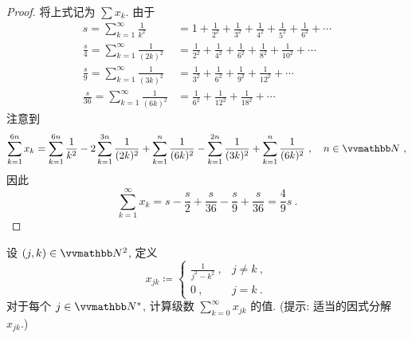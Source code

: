 \begin{proof}
    将上式记为 \(\sum x_k\). 由于
    \begin{align*}
        s = \sum_{k = 1}^\infty \frac{1}{k^2} &= 1 + \frac{1}{2^2} + \frac{1}{3^2} + \frac{1}{4^2} + \frac{1}{5^2} + \frac{1}{6^2} + \cdots\\
        \frac{s}{4} = \sum_{k = 1}^\infty \frac{1}{(2 k)^2} &= \frac{1}{2^2} + \frac{1}{4^2} + \frac{1}{6^2} + \frac{1}{8^2} + \frac{1}{10^2} + \cdots\\
        \frac{s}{9} = \sum_{k = 1}^\infty \frac{1}{(3 k)^2} &= \frac{1}{3^2} + \frac{1}{6^2} + \frac{1}{9^2} + \frac{1}{12^2} + \cdots\\
        \frac{s}{36} = \sum_{k = 1}^\infty \frac{1}{(6 k)^2} &= \frac{1}{6^2} + \frac{1}{12^2} + \frac{1}{18^2} + \cdots
    \end{align*}
    注意到
    \[
        \sum_{k = 1}^{6 n} x_k = \sum_{k = 1}^{6 n} \frac{1}{k^2} - 2 \sum_{k = 1}^{3 n} \frac{1}{(2 k)^2} + \sum_{k = 1}^n \frac{1}{(6 k)^2} - \sum_{k = 1}^{2 n} \frac{1}{(3 k)^2} + \sum_{k = 1}^n \frac{1}{(6 k)^2}\ ,\quad n \in \N\ ,
    \]
    因此
    \[
        \sum_{k = 1}^\infty x_k = s - \frac{s}{2} + \frac{s}{36} - \frac{s}{9} + \frac{s}{36} = \frac{4}{9} s\ .
    \]
\end{proof}

\begin{exercise}\label{ex:preliminary-discussion-of-double-series}
    设 \((j, k) \in \N^2\), 定义
    \[
        x_{j k} \coloneqq
        \begin{cases}
            \frac{1}{j^2 - k^2}\ , & j \neq k\ , \\
            0\ ,                   & j = k\ .
        \end{cases}
    \]
    对于每个 \(j \in \N^\ast\), 计算级数 \(\sum_{k = 0}^\infty x_{j k}\) 的值. (提示: 适当的因式分解 \(x_{j k}\).)
\end{exercise}

